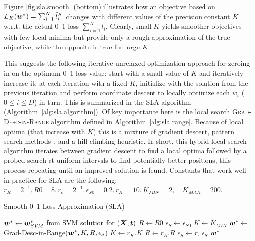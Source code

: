 Figure \ref{fig:sla.smooth} (bottom) illustrates how an objective
based on $L_K(\boldsymbol{w}^*) = \sum_{i=1}^N \tilde{l}_i^K$ changes with
different values of the precision constant $K$ w.r.t. the actual 0--1
loss $\sum_{i=1}^N l_i$.  Clearly, small $K$ yields smoother
objectives with few local minima but provide only a rough
approximation of the true objective, while the opposite is true for
large $K$.

This suggests the following iterative unrelaxed optimization approach
for zeroing in on the optimum 0--1 loss value: start with a small
value of $K$ and iteratively increase it; at each iteration with a
fixed $K$, initialize with the solution from the previous iteration
and perform coordinate descent to locally optimize each $w_i$ ($0 \leq
i \leq D$) in turn.  This is summarized in the SLA algorithm 
(Algorithm~\ref{alg:sla.algorithm}).  Of key importance here is the local
search \textsc{Grad-Desc-in-Range} algorithm defined in
Algorithm~\ref{alg:sla.range}.  Because of local optima (that increase
with $K$) this is a mixture of gradient descent, pattern search
methods~\cite{Hooke}, and a hill-climbing heuristic.  In short, this
hybrid local search algorithm iterates between gradient descent to
find a local optima followed by a probed search at uniform intervals
to find potentially better positions, this process repeating until 
an improved solution is found.  Constants that work well in practice
for SLA are the following: $r_R = 2^{-1}, R0 = 8, r_\epsilon = 2^{-1}, 
\epsilon_{S0} = 0.2, r_K = 10, K_{MIN} = 2, \quad K_{MAX} = 200$.

\begin{algorithm}
\caption{Smooth 0--1 Loss Approximation (SLA)}
\label{alg:sla.algorithm}
{\footnotesize
\begin{algorithmic}[1]
   \STATE $\boldsymbol{w}^* \gets \boldsymbol{w}^*_{\mathit{SVM}}$ from SVM solution for $(\boldsymbol{X},\boldsymbol{t})$
   \STATE $R \gets R0$
   \STATE $\epsilon_S \gets \epsilon_{S0}$
   \STATE $K \gets K_{MIN}$
      \STATE $\boldsymbol{w}^* \gets$ {\sc Grad-Desc-in-Range}($\boldsymbol{w}^*, K, R, \epsilon_S$)
      \STATE $K \gets r_K.K$
      \STATE $R \gets r_R.R$
      \STATE $\epsilon_S \gets r_\epsilon.\epsilon_S$
   \ENDWHILE
    $\boldsymbol{w}^*$
\ENDFUNCTION
\end{algorithmic}}
\end{algorithm}

